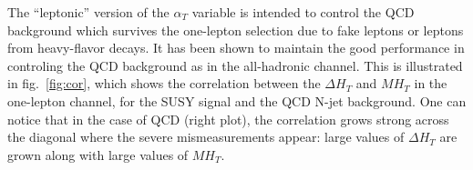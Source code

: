 The ``leptonic'' version of the $\alpha_{T}$ variable is intended to control the QCD background which survives the one-lepton selection due to fake leptons or leptons from heavy-flavor decays. It has been shown to maintain the good performance in controling the QCD background as in the all-hadronic channel. This is illustrated in fig.~\ref{fig:cor}, which shows the correlation between the $\Delta H_{T}$ and $MH_{T}$ in the one-lepton channel, for the SUSY signal and the QCD N-jet background. One can notice that in the case of QCD (right plot), the correlation grows strong across the diagonal where the severe mismeasurements appear: large values of $\Delta H_{T}$ are grown along with large values of $MH_{T}$.

